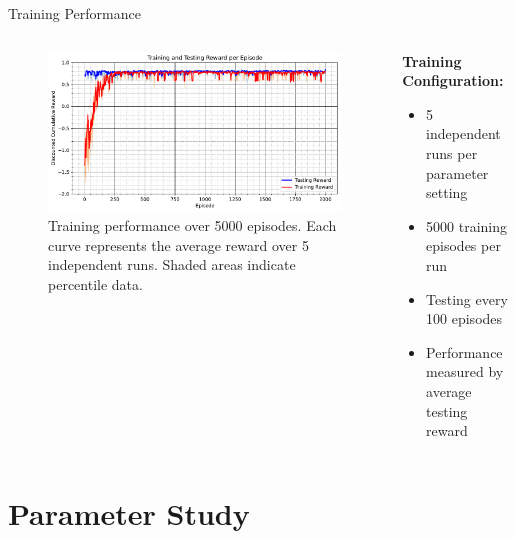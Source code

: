 \documentclass[aspectratio=169]{beamer}
\begin{document}
\begin{frame}{Training Performance}
    \begin{columns}
        \begin{column}{0.6\textwidth}
            \begin{figure}[h]
                \centering
                \includegraphics[width=\textwidth]{./Results/agent_reward.pdf}
                \caption{Training performance over 5000 episodes. Each curve represents the average reward over 5 independent runs. Shaded areas indicate percentile data.}
            \end{figure}
        \end{column}
        \begin{column}{0.4\textwidth}
            \textbf{Training Configuration:}
            \begin{itemize}
                \item 5 independent runs per parameter setting
                \item 5000 training episodes per run
                \item Testing every 100 episodes
                \item Performance measured by average testing reward
            \end{itemize}
        \end{column}
    \end{columns}
\end{frame}

\section{Parameter Study}
\end{document}
